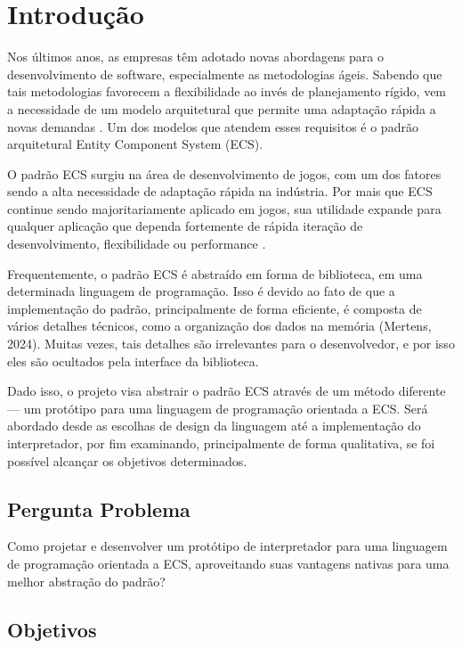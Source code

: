 \chapter{Introdução}\label{ch:introducao}

Nos últimos anos, as empresas têm adotado novas abordagens para o desenvolvimento de software, especialmente as metodologias ágeis. Sabendo que tais metodologias favorecem a flexibilidade ao invés de planejamento rígido, vem a necessidade de um modelo arquitetural que permite uma adaptação rápida a novas demandas \cite{agile}. Um dos modelos que atendem esses requisitos é o padrão arquitetural Entity Component System (ECS).

O padrão ECS surgiu na área de desenvolvimento de jogos, com um dos fatores sendo a alta necessidade de adaptação rápida na indústria. Por mais que ECS continue sendo majoritariamente aplicado em jogos, sua utilidade expande para qualquer aplicação que dependa fortemente de rápida iteração de desenvolvimento, flexibilidade ou performance \cite{flightdynamics}.

Frequentemente, o padrão ECS é abstraído em forma de biblioteca, em uma determinada linguagem de programação. Isso é devido ao fato de que a implementação do padrão, principalmente de forma eficiente, é composta de vários detalhes técnicos, como a organização dos dados na memória (Mertens, 2024). Muitas vezes, tais detalhes são irrelevantes para o desenvolvedor, e por isso eles são ocultados pela interface da biblioteca.

Dado isso, o projeto visa abstrair o padrão ECS através de um método diferente — um protótipo para uma linguagem de programação orientada a ECS. Será abordado desde as escolhas de design da linguagem até a implementação do interpretador, por fim examinando, principalmente de forma qualitativa, se foi possível alcançar os objetivos determinados.

\section{Pergunta Problema}

Como projetar e desenvolver um protótipo de interpretador para uma linguagem de programação orientada a ECS, aproveitando suas vantagens nativas para uma melhor abstração do padrão?

\section{Objetivos}

